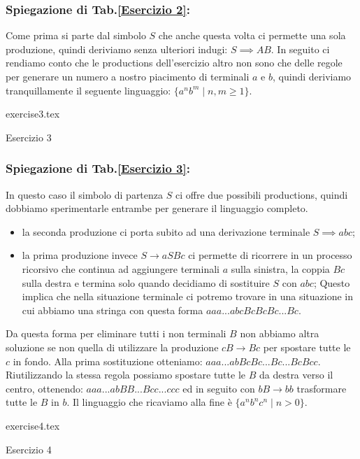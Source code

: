 \documentclass[class=book, crop=false, oneside, 12pt]{standalone}
\begin{document}
\subsubsection*{Spiegazione di Tab.\ref{Esercizio 2}:}
Come prima si parte dal simbolo \(S\) che anche questa volta ci permette una sola produzione, quindi deriviamo senza ulteriori indugi: \(S \implies AB\). In seguito ci rendiamo conto che le productions dell'esercizio altro non sono che delle regole per generare un numero a nostro piacimento di terminali \(a\) e \(b\), quindi deriviamo tranquillamente il seguente linguaggio: \(\{a^n b^m \mid n,m \ge 1\}\).
\begin{table}[H]
	\centering
	{exercise3.tex}
    \caption{Esercizio 3}
    \label{Esercizio 3}
\end{table}
\subsubsection*{Spiegazione di Tab.\ref{Esercizio 3}:}
In questo caso il simbolo di partenza \(S\) ci offre due possibili productions, quindi dobbiamo sperimentarle entrambe per generare il linguaggio completo.
\begin{itemize}
    \item la seconda produzione ci porta subito ad una derivazione terminale \(S \implies abc\);
    \item la prima produzione invece \(S \to aSBc\) ci permette di ricorrere in un processo ricorsivo che continua ad aggiungere terminali \(a\) sulla sinistra, la coppia \(Bc\) sulla destra e termina solo quando decidiamo di sostituire \(S\) con \(abc\); Questo implica che nella situazione terminale ci potremo trovare in una situazione in cui abbiamo una stringa con questa forma \(aaa...abcBcBcBc...Bc\).
\end{itemize}
Da questa forma per eliminare tutti i non terminali \(B\) non abbiamo altra soluzione se non quella di utilizzare la produzione \(cB \to Bc\) per spostare tutte le \(c\) in fondo. Alla prima sostituzione otteniamo: \(aaa...abBcBc ... Bc ... BcBcc\). Riutilizzando la stessa regola possiamo spostare tutte le \( B \) da destra verso il centro, ottenendo: \(aaa...abBB...Bcc...ccc\)  ed in seguito con \(bB \to bb\) trasformare tutte le \(B\) in \(b\). Il linguaggio che ricaviamo alla fine è \(\{a^nb^nc^n \mid n>0\}\).
\begin{table}[H]
	\centering
	{exercise4.tex}
    \caption{Esercizio 4}
    \label{Esercizio 4}
\end{table}
\end{document}
